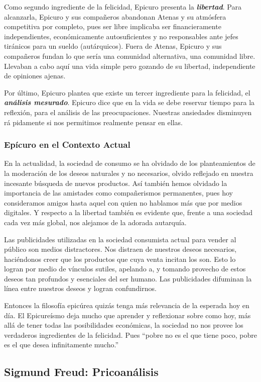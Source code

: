 \documentclass{article}
\begin{document}
Como segundo ingrediente de la felicidad, Epicuro presenta la \textit{\textbf{libertad}}. Para alcanzarla, Epicuro y sus compañeros abandonan Atenas y su atmósfera competitiva por completo, pues ser libre implicaba ser financieramente independientes, económicamente autosuficientes y no responsables ante jefes tiránicos para un sueldo (autárquicos). Fuera de Atenas, Epicuro y sus compañeros fundan lo que sería una comunidad alternativa, una comunidad libre. Llevaban a cabo aquí una vida simple pero gozando de su libertad, independiente de opiniones ajenas.

Por último, Epicuro plantea que existe un tercer ingrediente para la felicidad, el \textit{\textbf{análisis mesurado}}. Epicuro dice que en la vida se debe reservar tiempo para la reflexión, para el análisis de las preocupaciones. Nuestras ansiedades disminuyen rá    pidamente si nos permitimos realmente pensar en ellas.

\subsubsection{Epícuro en el Contexto Actual}

En la actualidad, la sociedad de consumo se ha olvidado de los planteamientos de la moderación de los deseos naturales y no necesarios, olvido reflejado en nuestra incesante búsqueda de nuevos productos. Así también hemos olvidado la importancia de las amistades como compañerismos permanentes, pues hoy consideramos amigos hasta aquel con quien no hablamos más que por medios digitales. Y respecto a la libertad también es evidente que, frente a una sociedad cada vez más global, nos alejamos de la adorada autarquía.

Las publicidades utilizadas en la sociedad consumista actual para vender al público son medios distractores. Nos distraen de nuestros deseos necesarios, haciéndonos creer que los productos que cuya venta incitan los son. Esto lo logran por medio de vínculos sutiles, apelando a, y tomando provecho de estos deseos tan profundos y esenciales del ser humano. Las publicidades difuminan la línea entre nuestros deseos y logran confundirnos.

Entonces la filosofía epicúrea quizás tenga más relevancia de la esperada hoy en día. El Epicureísmo deja mucho que aprender y reflexionar sobre como hoy, más allá de tener todas las posibilidades económicas, la sociedad no nos provee los verdaderos ingredientes de la felicidad. Pues ``pobre no es el que tiene poco, pobre es el que desea infinitamente mucho.'' 

\subsection{Sigmund Freud: Pricoanálisis}
\end{document}
